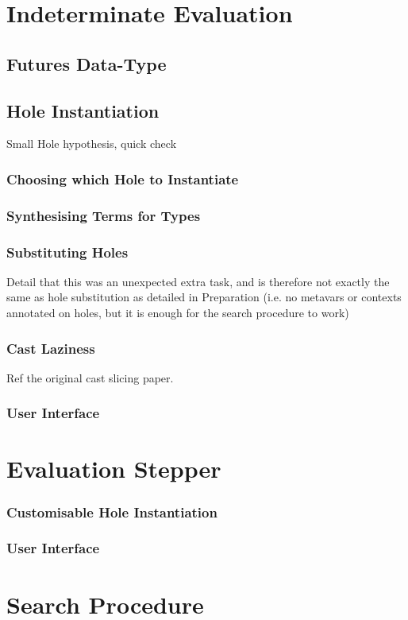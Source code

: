 \section{Indeterminate Evaluation}
\subsection{Futures Data-Type}
\subsection{Hole Instantiation}
Small Hole hypothesis, quick check
\subsubsection{Choosing which Hole to Instantiate}
\subsubsection{Synthesising Terms for Types}
\subsubsection{Substituting Holes}
Detail that this was an unexpected extra task, and is therefore not exactly the same as hole substitution as detailed in Preparation (i.e. no metavars or contexts annotated on holes, but it is enough for the search procedure to work)
\subsubsection{Cast Laziness}
Ref the original cast slicing paper.
\subsubsection{User Interface}

\section{Evaluation Stepper}
\subsubsection{Customisable Hole Instantiation}
\subsubsection{User Interface}


\section{Search Procedure}
